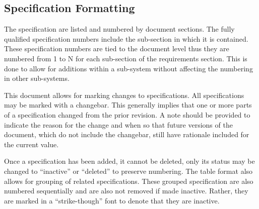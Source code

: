 
\subsection{Specification Formatting}
\label{ssec:Intro_SpecFormatting}

The specification are listed and numbered by document sections. 
The fully qualified specification numbers include the sub-section in which it is contained. 
These specification numbers are tied to the document level thus they are numbered from 1 to N for each sub-section of the requirements section. 
This is done to allow for additions within a sub-system without affecting the numbering in other sub-systems.

This document allows for marking changes to specifications.
All specifications may be marked with a changebar.
This generally implies that one or more parts of a specification changed from the prior revision.
A note should be provided to indicate the reason for the change and when so that future versions of the document, which do not include the changebar, still have rationale included for the current value.
 
Once a specification has been added, it cannot be deleted, only its status may be changed to ``inactive'' or ``deleted'' to preserve numbering.
The table format also allows for grouping of related specifications.
These grouped specification are also numbered sequentially and are also not removed if made inactive. 
Rather, they are marked in a ``strike-though'' font to denote that they are inactive.


